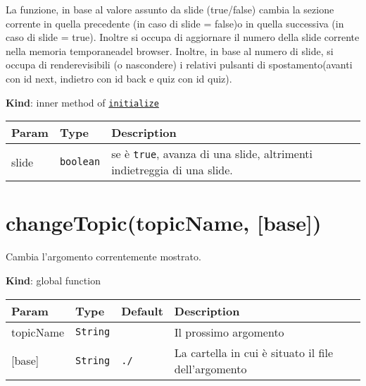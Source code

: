 La funzione, in base al valore assunto da slide (true/false) cambia la
sezione corrente in quella precedente (in caso di slide = false)o in
quella successiva (in caso di slide = true). Inoltre si occupa di
aggiornare il numero della slide corrente nella memoria temporaneadel
browser. Inoltre, in base al numero di slide, si occupa di
renderevisibili (o nascondere) i relativi pulsanti di spostamento(avanti
con id next, indietro con id back e quiz con id quiz).

\textbf{Kind}: inner method of
\protect\hyperlink{initialize}{\texttt{initialize}}

\begin{longtabu} to \textwidth {X[1,L,m]X[1,L,m]X[1.5,L,m]}
\toprule
\begin{minipage}[b]{0.30\columnwidth}\raggedright
Param\strut
\end{minipage} & \begin{minipage}[b]{0.30\columnwidth}\raggedright
Type\strut
\end{minipage} & \begin{minipage}[b]{0.30\columnwidth}\raggedright
Description\strut
\end{minipage}\tabularnewline
\midrule
\endhead
\begin{minipage}[t]{0.30\columnwidth}\raggedright
slide\strut
\end{minipage} & \begin{minipage}[t]{0.30\columnwidth}\raggedright
\texttt{boolean}\strut
\end{minipage} & \begin{minipage}[t]{0.30\columnwidth}\raggedright
se è \texttt{true}, avanza di una slide, altrimenti indietreggia di una
slide.\strut
\end{minipage}\tabularnewline
\bottomrule
\end{longtabu}

\protect\hypertarget{changeTopic}{}{}

\hypertarget{changetopictopicname-base}{%
\section{changeTopic(topicName,
{[}base{]})}\label{changetopictopicname-base}}

Cambia l'argomento correntemente mostrato.

\textbf{Kind}: global function

\begin{longtabu} to \textwidth {X[1,L,m]X[1,L,m]X[1.5,L,m]X[1.5,L,m]}
\toprule
Param & Type & Default & Description\tabularnewline
\midrule
\endhead
topicName & \texttt{String} & & Il prossimo argomento\tabularnewline
{[}base{]} & \texttt{String} & \texttt{./} & La cartella in cui è
situato il file dell'argomento\tabularnewline
\bottomrule
\end{longtabu}

